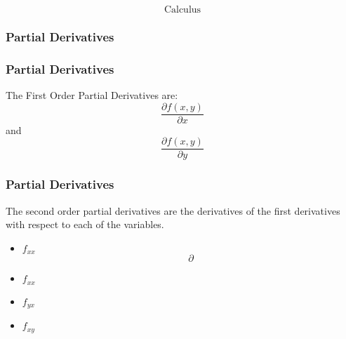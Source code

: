 \documentclass{beamer}
\begin{document}
\begin{frame}
\Large
\[\mbox{Calculus}\]
\end{frame}
\begin{frame}
\frametitle{Partial Derivatives}
\end{frame}
\begin{frame}

\frametitle{Partial Derivatives}
\LARGE
The First Order Partial Derivatives are:
\[\frac{\partial f(x,y)}{\partial x}\]
and
\[\frac{\partial f(x,y)}{\partial y}\]
\end{frame}
\begin{frame}
\frametitle{Partial Derivatives}
The second order partial derivatives are the derivatives of the first derivatives with respect to each of the variables.

\begin{itemize}
\item $f_{xx}$
\[\partial\]
\item $f_{xx}$
\item $f_{yx}$
\item $f_{xy}$
\end{itemize}
\end{frame}
\end{document}
